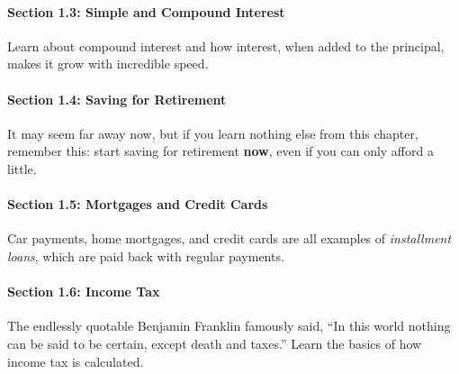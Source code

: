 \paragraph{Section 1.3: Simple and Compound Interest} Learn about compound interest and how interest, when added to the principal, makes it grow with incredible speed.

\paragraph{Section 1.4: Saving for Retirement} It may seem far away now, but if you learn nothing else from this chapter, remember this: start saving for retirement \textbf{now}, even if you can only afford a little.

\paragraph{Section 1.5: Mortgages and Credit Cards} Car payments, home mortgages, and credit cards are all examples of \textit{installment loans}, which are paid back with regular payments.

\paragraph{Section 1.6: Income Tax} The endlessly quotable Benjamin Franklin famously said, ``In this world nothing can be said to be certain, except death and taxes.''  Learn the basics of how income tax is calculated.